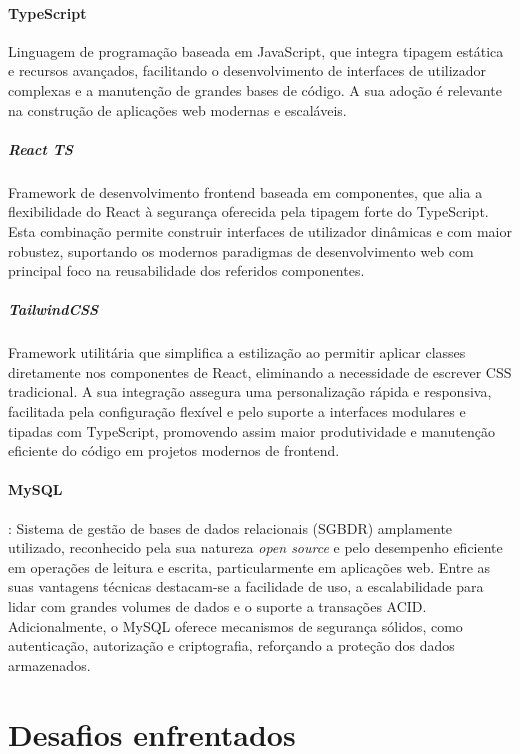 \paragraph{TypeScript} Linguagem de programação baseada em JavaScript, que integra tipagem estática e recursos avançados, facilitando o desenvolvimento de interfaces de utilizador complexas e a manutenção de grandes bases de código. A sua adoção é relevante na construção de aplicações web modernas e escaláveis.

\subparagraph{React TS} Framework de desenvolvimento frontend baseada em componentes, que alia a flexibilidade do React à segurança oferecida pela tipagem forte do TypeScript. Esta combinação permite construir interfaces de utilizador dinâmicas e com maior robustez, suportando os modernos paradigmas de desenvolvimento web com principal foco na reusabilidade dos referidos componentes.

\subparagraph{TailwindCSS} Framework utilitária que simplifica a estilização ao permitir aplicar classes diretamente nos componentes de React, eliminando a necessidade de escrever CSS tradicional. A sua integração assegura uma personalização rápida e responsiva, facilitada pela configuração flexível e pelo suporte a interfaces modulares e tipadas com TypeScript, promovendo assim maior produtividade e manutenção eficiente do código em projetos modernos de frontend.

\paragraph{MySQL}: Sistema de gestão de bases de dados relacionais (SGBDR) amplamente utilizado, reconhecido pela sua natureza \textit{open source} e pelo desempenho eficiente em operações de leitura e escrita, particularmente em aplicações web. Entre as suas vantagens técnicas destacam-se a facilidade de uso, a escalabilidade para lidar com grandes volumes de dados e o suporte a transações ACID. Adicionalmente, o MySQL oferece mecanismos de segurança sólidos, como autenticação, autorização e criptografia, reforçando a proteção dos dados armazenados.




\section{Desafios enfrentados}


